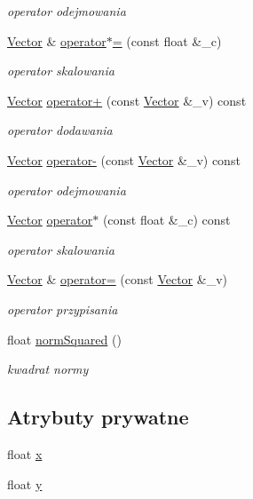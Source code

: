 \begin{DoxyCompactItemize}
\begin{DoxyCompactList}\small\item\em operator odejmowania \end{DoxyCompactList}\item 
\hyperlink{class_vector}{Vector} \& \hyperlink{class_vector_a91ebac6d502ca1d54645e7c711549867}{operator$\ast$=} (const float \&\-\_\-c)
\begin{DoxyCompactList}\small\item\em operator skalowania \end{DoxyCompactList}\item 
\hyperlink{class_vector}{Vector} \hyperlink{class_vector_aa78eb4c9e5ac236c89f0853eefa347ac}{operator+} (const \hyperlink{class_vector}{Vector} \&\-\_\-v) const 
\begin{DoxyCompactList}\small\item\em operator dodawania \end{DoxyCompactList}\item 
\hyperlink{class_vector}{Vector} \hyperlink{class_vector_a94b6fde82bef6532c00358a0af448fc1}{operator-\/} (const \hyperlink{class_vector}{Vector} \&\-\_\-v) const 
\begin{DoxyCompactList}\small\item\em operator odejmowania \end{DoxyCompactList}\item 
\hyperlink{class_vector}{Vector} \hyperlink{class_vector_a8f0e64ee9a688803b1efce30fb0b2869}{operator$\ast$} (const float \&\-\_\-c) const 
\begin{DoxyCompactList}\small\item\em operator skalowania \end{DoxyCompactList}\item 
\hyperlink{class_vector}{Vector} \& \hyperlink{class_vector_ad44f6d9721d9584e7f847e449df73e11}{operator=} (const \hyperlink{class_vector}{Vector} \&\-\_\-v)
\begin{DoxyCompactList}\small\item\em operator przypisania \end{DoxyCompactList}\item 
float \hyperlink{class_vector_a18d3f2110be751ac3a658016bd3dca69}{norm\-Squared} ()
\begin{DoxyCompactList}\small\item\em kwadrat normy \end{DoxyCompactList}\end{DoxyCompactItemize}
\subsection*{Atrybuty prywatne}
\begin{DoxyCompactItemize}
\item 
float \hyperlink{class_vector_aca49165049a1e21ae47afcfc078819ed}{x}
\item 
float \hyperlink{class_vector_a81be9102fca6d9beea3efef522c4c09d}{y}
\end{DoxyCompactItemize}
